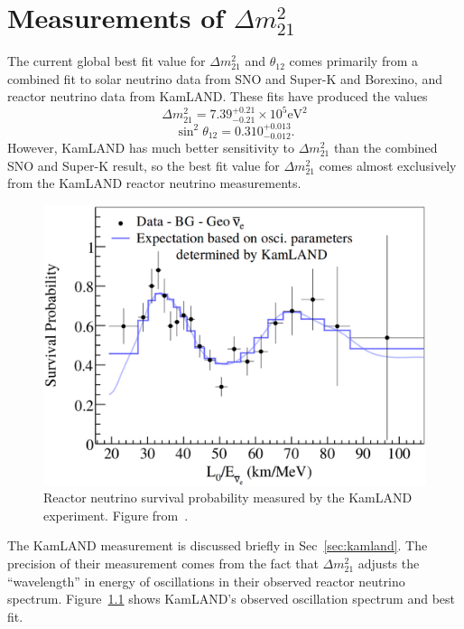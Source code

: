 \chapter{Measurements of \textbf{$\Delta m^{2}_{21}$}}
\label{sec:dm21_tension}
The current global best fit value for  $\Delta m^{2}_{21}$ and
$\theta_{12}$ comes
primarily from a combined fit to solar neutrino data from SNO
and Super-K and Borexino, and reactor neutrino data from KamLAND\@.
These fits have produced the values
\begin{equation}
    \Delta m^{2}_{21} = 7.39^{+0.21}_{-0.21}\times10^5 \text{eV}^{2}
\end{equation}
\begin{equation}
    \sin^2\theta_{12} = 0.310^{+0.013}_{-0.012}\text{.}
\end{equation}
However, KamLAND has much better sensitivity to $\Delta m^{2}_{21}$
than the combined SNO and Super-K result, so the best fit value for
$\Delta m^{2}_{21}$ comes almost exclusively from the KamLAND
reactor neutrino measurements.
\begin{figure}[htbp]
    \centering
    \includegraphics[width=\textwidth]{kamland_oscillation}
    \caption[KamLAND Oscillation Spectrum]{
    Reactor neutrino survival probability measured
    by the KamLAND experiment. Figure from~\cite{kamland_reactor}.}
    \label{fig:kamland_oscillation}
\end{figure}
The KamLAND measurement is discussed briefly in Sec~\ref{sec:kamland}.
The precision of their measurement comes from the fact that $\Delta m^{2}_{21}$
adjusts the ``wavelength'' in energy of oscillations in their observed
reactor neutrino spectrum.
Figure~\ref{fig:kamland_oscillation} shows KamLAND's observed oscillation
spectrum and best fit.

